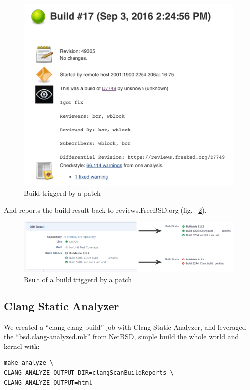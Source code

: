 \documentclass[a4paper,twocolumn,10pt]{article}
\begin{document}
\begin{figure}
\includegraphics{build-patch.png}
\caption{Build triggerd by a patch}
\label{build-patch}
\end{figure}

And reports the build result back to reviews.FreeBSD.org (fig.
~\ref{patch-build-result}).

\begin{figure}
\includegraphics[width=\textwidth]{patch-build-result.png}
\caption{Rsult of a build triggerd by a patch}
\label{patch-build-result}
\end{figure}

\subsection{Clang Static Analyzer}

We created a ``clang clang-build'' job with Clang Static Analyzer, and
leveraged the ``bsd.clang-analyzed.mk'' from NetBSD, simple build the whole
world and kernel with:

\begin{lstlisting}
make analyze \
CLANG_ANALYZE_OUTPUT_DIR=clangScanBuildReports \
CLANG_ANALYZE_OUTPUT=html
\end{lstlisting}
\end{document}
